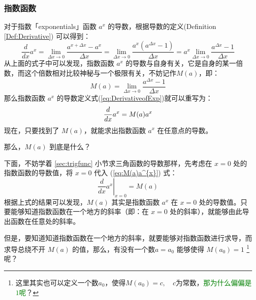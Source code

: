 \documentclass{ctexart}
\numberwithin{equation}{section}
\numberwithin{figure}{section}
\begin{document}
\subsubsection{指数函数}\label{sec:ExponentialsFunc}

对于指数「exponentials」函数 \(a^{x}\) 的导数，根据导数的定义(Definition \ref{Def:Derivative}) 可以得到：
\begin{equation}\label{eq:DerivativeofExp}
    \frac{d}{dx}a^{x} = \lim\limits_{\Delta x \to 0}\frac{a^{x + \Delta x} - a^{x}}{\Delta x} = \lim\limits_{\Delta x \to 0}\frac{a^{x}\left(a^{\Delta x} - 1\right)}{\Delta x} = a^{x} \lim\limits_{\Delta x \to 0}\frac{a^{\Delta x} - 1}{\Delta x}
\end{equation}
从上面的式子中可以发现，指数函数 \(a^{x}\) 的导数与自身有关，它是自身的某一倍数，而这个倍数相对比较神秘与一个极限有关，不妨记作\(M(a)\)，即：
\begin{equation}
    M(a) = \lim\limits_{\Delta x \to 0}\frac{a^{\Delta x} - 1}{\Delta x}
\end{equation}
那么指数函数 \(a^{x}\) 的导数定义式(\ref{eq:DerivativeofExp})就可以重写为：
\begin{equation}\label{eq:M(a)a^{x}}
    \frac{d}{dx}a^{x} = M(a)a^{x}
\end{equation}
现在，只要找到了 \(M(a)\)，就能求出指数函数 \(a^{x}\) 在任意点的导数。

那么，\(M(a)\) 到底是什么？

下面，不妨学着 \ref{sec:trigfunc} 小节求三角函数的导数那样，先考虑在 \(x=0\) 处的指数函数的导数值，将 \(x=0\) 代入 (\ref{eq:M(a)a^{x}}) 式：
\begin{equation}\label{eq:DerivativeofExpAt0}
    \left.\frac{d}{dx}a^{x}\right|_{x=0} = M(a)
\end{equation}
根据上式的结果可以发现，\(M(a)\) 其实是指数函数 \(a^{x}\) 在 \(x=0\) 处的导数值。只要能够知道指数函数在一个地方的斜率（即：在 \(x=0\) 处的斜率），就能够由此导出函数在任意处的斜率。

但是，要知道知道指数函数在一个地方的斜率，就要能够对指数函数进行求导，而求导总绕不开 \(M(a)\) 的值，那么，有没有一个数\(a=a_{0}\) 能够使得 \(M(a_{0}) = 1\) \footnote{这里其实也可以定义一个数\(a_0\)，使得\(M(a_{0}) = c,\quad c\text{为常数}\)，\textcolor{green}{那为什么偏偏是\(1\)呢}？}呢？
\end{document}
